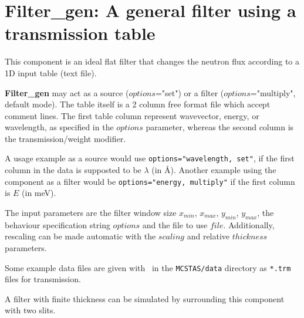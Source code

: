 \section{Filter\_gen: A general filter using a transmission table}
\label{filter-gen}


This component is an ideal flat filter 
that changes the neutron flux according to a 1D input table (text file).

{\bf Filter\_gen} may act as a source ($options$="set") 
or a filter ($options$="multiply", default mode). 
The table itself is a 2 column free format file which accept comment lines. 
The first table column represent wavevector, energy, or wavelength, 
as specified in the $options$ parameter, 
whereas the second column is the transmission/weight modifier.

A usage example as a source would use 
\verb+options="wavelength, set"+, if the first column in the data 
is supposted to be $\lambda$ (in \AA ). 
Another example using the component as a filter would be 
\verb+options="energy, multiply"+ if the first column is $E$ (in meV).

The input parameters are the filter window size 
$x_{min}$, $x_{max}$, $y_{min}$, $y_{max}$, 
the behaviour specification string $options$ and the file to use $file$. 
Additionally, rescaling can be made automatic with the $scaling$ 
and relative $thickness$ parameters.

Some example data files are given with \MCS\ in the 
\verb+MCSTAS/data+ directory as \verb+*.trm+ files for transmission. 

A filter with finite thickness can be simulated by 
surrounding this component with two slits.